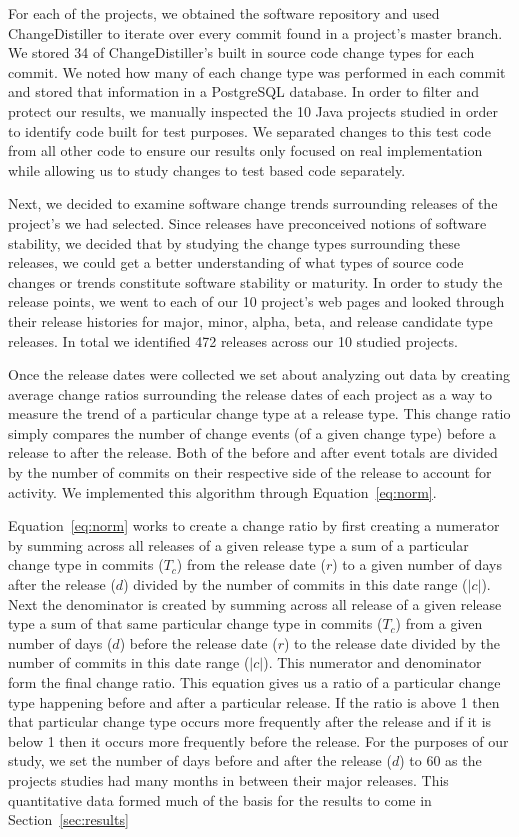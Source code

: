 \documentclass{sig-alternate}
\begin{document}
For each of the projects, we obtained the software repository and used ChangeDistiller to iterate over every commit found in a project's master branch. We stored
34 of ChangeDistiller's built in source code change types for each commit. We noted how many of each change type was performed in each commit and stored that information
in a PostgreSQL database. In order to filter and protect our results, we manually inspected the 10 Java projects studied in order to identify code built for test
purposes.
We separated changes to this test code from all other code to ensure our results only focused on real implementation while allowing us to study changes to
test based code separately.

Next, we decided to examine software change trends surrounding releases of the project's we had selected. Since releases
have preconceived notions of software stability, we decided that by studying the change types surrounding these releases, we could get a better understanding of
what types of source code changes or trends constitute software stability or maturity. In order to study the release points, we went to each of our 10 project's 
web pages and looked through their release histories for major, minor, alpha, beta, and release candidate type releases. In total we identified 472 releases
across our 10 studied projects.  

Once the release dates were collected we set about analyzing out data by creating average change ratios surrounding the release dates of each 
project as a way to measure the trend of a particular change type at a release type. This change ratio simply compares the number of change events (of a given
change type) before a release to after the release. Both of the before and after event totals are divided by the number of commits on their respective side
of the release to account for activity. We implemented this algorithm through Equation~\ref{eq:norm}.

Equation~\ref{eq:norm} works to create a change ratio by first creating a numerator by summing across all releases of
a given release type a sum of a particular change type in commits ($T_c$)
from the release date ($r$) to a given number of days after the release ($d$) divided by the number of commits in this date range ($|c|$). Next the denominator
is created by summing across all release of a given release type
a sum of that same particular change type in commits ($T_c$) from a given number of days ($d$) before the release date ($r$) to
the release date divided by the number of commits in this date range ($|c|$). This numerator and denominator form the final change ratio.
This equation gives us a ratio of a particular change type happening before and after a particular release. If the ratio is above 1 then that particular change
type occurs more frequently after the release and if it is below 1 then it occurs more frequently before the release. For the purposes of our study, we set the
number of days before and after the release ($d$) to 60 as the projects studies had many months in between their major releases. This quantitative data
formed much of the basis for the results to come in Section~\ref{sec:results}
\end{document}
